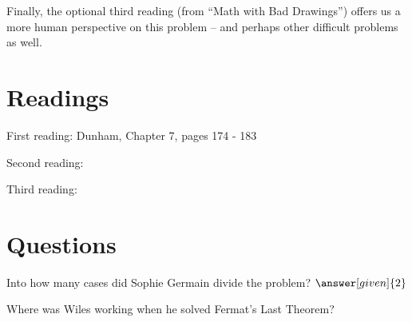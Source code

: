 \documentclass[nooutcomes]{ximera}
\begin{document}
Finally, the optional third reading (from ``Math with Bad Drawings'') offers us a more human perspective on this problem -- and perhaps other difficult problems as well.

\section{Readings}
First reading: Dunham, Chapter 7, pages 174 - 183

Second reading: 

Third reading: 



\section{Questions}

\begin{question}
Into how many cases did Sophie Germain divide the problem? $\answer[given]{2}$
\end{question}

\begin{question}
Where was Wiles working when he solved Fermat's Last Theorem?
\begin{multipleChoice}
\end{multipleChoice}
\end{question}

%
%


\end{document}
